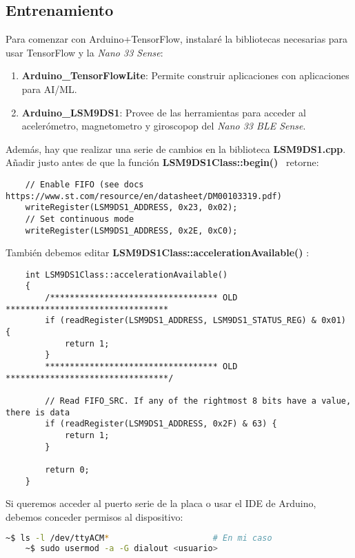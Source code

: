 \begin{mimargen}{-0.65cm}{-1cm}
\chapter{Entrenamiento}

Para comenzar con Arduino+TensorFlow, instalaré la bibliotecas
necesarias para usar TensorFlow y la \textit{Nano 33 Sense}:
\begin{enumerate}
    \item \textbf{Arduino\_TensorFlowLite}: Permite construir aplicaciones con
    aplicaciones para AI/ML.
    \item \textbf{Arduino\_LSM9DS1}: Provee de las herramientas para acceder al
    acelerómetro, magnetometro y giroscopop del \textit{Nano 33 BLE Sense}.
\end{enumerate}

\cite{github-magicwand}Además, hay que realizar una serie de cambios en la biblioteca
\small\textbf{LSM9DS1.cpp}.\normalsize\\
Añadir justo antes de que la función \small\textbf{LSM9DS1Class::begin()}\normalsize
~retorne:
\begin{lstlisting}
    // Enable FIFO (see docs https://www.st.com/resource/en/datasheet/DM00103319.pdf)
    writeRegister(LSM9DS1_ADDRESS, 0x23, 0x02);
    // Set continuous mode
    writeRegister(LSM9DS1_ADDRESS, 0x2E, 0xC0);
\end{lstlisting}

También debemos editar \small\textbf{LSM9DS1Class::accelerationAvailable()}
\normalsize:
\begin{lstlisting}
    int LSM9DS1Class::accelerationAvailable()
    {
        /********************************** OLD *********************************
        if (readRegister(LSM9DS1_ADDRESS, LSM9DS1_STATUS_REG) & 0x01) { 
            return 1; 
        }
        *********************************** OLD *********************************/
    
        // Read FIFO_SRC. If any of the rightmost 8 bits have a value, there is data
        if (readRegister(LSM9DS1_ADDRESS, 0x2F) & 63) {
            return 1;
        }
        
        return 0;
    }
\end{lstlisting}

Si queremos acceder al puerto serie de la placa o usar el IDE de Arduino, debemos
conceder permisos al dispositivo:
\begin{lstlisting}[language=bash]
    ~$ ls -l /dev/ttyACM*                     # En mi caso
    ~$ sudo usermod -a -G dialout <usuario>
\end{lstlisting}~\\



\end{mimargen}
